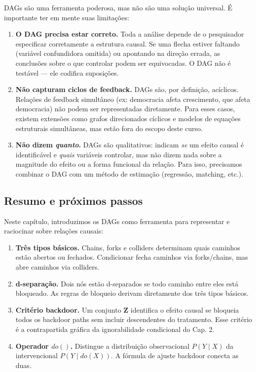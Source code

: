\documentclass[
]{article}
\begin{document}
DAGs são uma ferramenta poderosa, mas não são uma solução universal. É importante ter em mente suas limitações:

\begin{enumerate}
\def\labelenumi{\arabic{enumi}.}
\item
  \textbf{O DAG precisa estar correto.} Toda a análise depende de o pesquisador especificar corretamente a estrutura causal. Se uma flecha estiver faltando (variável confundidora omitida) ou apontando na direção errada, as conclusões sobre o que controlar podem ser equivocadas. O DAG não é testável --- ele codifica suposições.
\item
  \textbf{Não capturam ciclos de feedback.} DAGs são, por definição, acíclicos. Relações de feedback simultâneo (ex: democracia afeta crescimento, que afeta democracia) não podem ser representadas diretamente. Para esses casos, existem extensões como grafos direcionados cíclicos e modelos de equações estruturais simultâneas, mas estão fora do escopo deste curso.
\item
  \textbf{Não dizem \emph{quanto}.} DAGs são qualitativos: indicam \emph{se} um efeito causal é identificável e \emph{quais} variáveis controlar, mas não dizem nada sobre a magnitude do efeito ou a forma funcional da relação. Para isso, precisamos combinar o DAG com um método de estimação (regressão, matching, etc.).
\end{enumerate}

\subsection{Resumo e próximos passos}\label{resumo-e-pruxf3ximos-passos-2}

Neste capítulo, introduzimos os DAGs como ferramenta para representar e raciocinar sobre relações causais:

\begin{enumerate}
\def\labelenumi{\arabic{enumi}.}
\item
  \textbf{Três tipos básicos.} Chains, forks e colliders determinam quais caminhos estão abertos ou fechados. Condicionar fecha caminhos via forks/chains, mas abre caminhos via colliders.
\item
  \textbf{d-separação.} Dois nós estão d-separados se todo caminho entre eles está bloqueado. As regras de bloqueio derivam diretamente dos três tipos básicos.
\item
  \textbf{Critério backdoor.} Um conjunto \(\mathbf{Z}\) identifica o efeito causal se bloqueia todos os backdoor paths sem incluir descendentes do tratamento. Esse critério é a contrapartida gráfica da ignorabilidade condicional do Cap. 2.
\item
  \textbf{Operador \(do()\).} Distingue a distribuição observacional \(P(Y \mid X)\) da intervencional \(P(Y \mid do(X))\). A fórmula de ajuste backdoor conecta as duas.
\end{enumerate}
\end{document}
